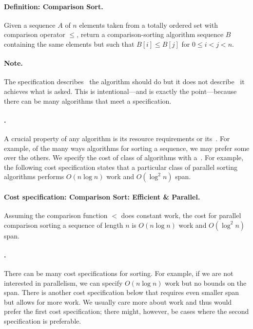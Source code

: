 \paragraph{Definition: Comparison Sort.}
Given a sequence $A$ of $n$ elements taken from a totally ordered set
with comparison operator $\leq$, return a comparison-sorting algorithm
sequence $B$ containing the same elements but such that $B[i] \leq
B[j]$ for $0 \leq i < j < n$.

\paragraph{Note.}
The specification describes~ the algorithm should do but it
does not describe~ it achieves what is asked.
%
This is intentional---and is exactly the point---because there can be
many algorithms that meet a specification.
%

\paragraph{.}
A crucial property of any algorithm is its resource requirements or
its~.
%
For example, of the many ways algorithms for sorting a sequence, we
may prefer some over the others.  
%
We specify the cost of class of algorithms with a~.  For example, the following cost specification
states that a particular class of parallel sorting algorithms performs
$O(n \log{n})$ work and $O(\log^2{n})$ span.

\paragraph{Cost specification: Comparison Sort: Efficient \& Parallel.}
Assuming the comparison function $<$ does constant work, the cost for
parallel comparison sorting a sequence of length $n$ is $O(n \log n)$
work and $O(\log^2 n)$ span.

\paragraph{.}
There can be many cost specifications for sorting.  For example, if we
are not interested in parallelism, we can specify $O(n \log{n})$ work
but no bounds on the span. There is another cost specification below
that requires even smaller span but allows for more work.
%
We usually care more about work and thus would prefer the first cost
specification; there might, however, be cases where the second
specification is preferable.

